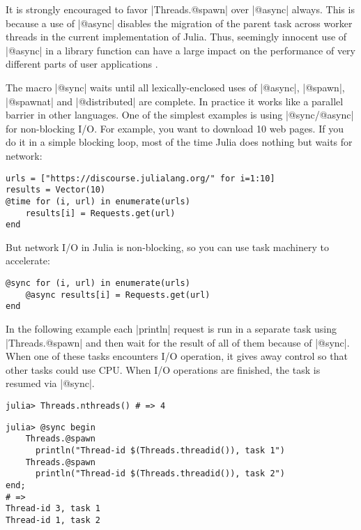 It is strongly encouraged to favor |Threads.@spawn| over |@async| always.
This is because a use of |@async| disables the migration of the parent task across worker threads in the current implementation of Julia. Thus, seemingly innocent use of |@async| in a library function can have a large impact on the performance of very different parts of user applications \cite{julia:parallel:task}.



The macro |@sync| waits until all lexically-enclosed uses of |@async|, |@spawn|, |@spawnat| and |@distributed| are complete. In practice it works like a parallel barrier in other languages.
One of the simplest examples is using |@sync/@async| for non-blocking I/O.  For example, you want to download 10 web pages. If you do it in a simple blocking loop, most of the time Julia does nothing but waits for network: 
\begin{lstlisting}[language=JuliaLocal, style=julia]
urls = ["https://discourse.julialang.org/" for i=1:10]
results = Vector(10)
@time for (i, url) in enumerate(urls)
    results[i] = Requests.get(url)
end
\end{lstlisting}
But network I/O in Julia is non-blocking, so you can use task machinery to accelerate:
\begin{lstlisting}[language=JuliaLocal, style=julia]
@sync for (i, url) in enumerate(urls)
    @async results[i] = Requests.get(url)
end
\end{lstlisting}



In the following example each |println| request is run in a separate task using |Threads.@spawn| and then wait for the result of all of them because of |@sync|. 
When one of these tasks encounters I/O operation, it gives away control so that other tasks could use CPU. 
When I/O operations are finished, the task is resumed via |@sync|.

\begin{lstlisting}[language=JuliaLocal, style=julia, mathescape=false]
julia> Threads.nthreads() # => 4
\end{lstlisting}
\begin{lstlisting}[language=JuliaLocal, style=julia, mathescape=false]
julia> @sync begin
    Threads.@spawn 
      println("Thread-id $(Threads.threadid()), task 1")
    Threads.@spawn 
      println("Thread-id $(Threads.threadid()), task 2")
end;
# =>
Thread-id 3, task 1
Thread-id 1, task 2
\end{lstlisting}




